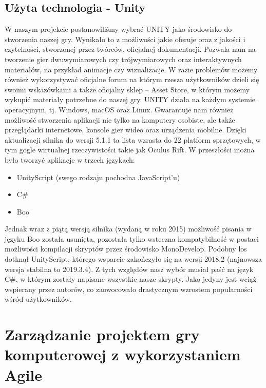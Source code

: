 \documentclass[oneside,polski,logo]{amuthesis}
\begin{document}
\section{Użyta technologia - Unity}
 W naszym projekcie postanowiliśmy wybrać UNITY jako środowisko do stworzenia naszej gry. Wynikało to z możliwości jakie oferuje oraz z jakości i czytelności, stworzonej przez twórców, oficjalnej dokumentacji. Pozwala nam na tworzenie gier dwuwymiarowych czy trójwymiarowych oraz interaktywnych materiałów, na przykład animacje czy wizualizacje. W razie problemów możemy również wykorzystywać oficjalne forum na którym rzesza użytkowników dzieli się swoimi wskazówkami a także oficjalny sklep – Asset Store, w którym możemy wykupić materiały potrzebne do naszej gry. UNITY działa na każdym systemie operacyjnym, tj. Windows, macOS oraz Linux. Gwarantuje nam również możliwość stworzenia aplikacji nie tylko na komputery osobiste, ale także przeglądarki internetowe, konsole gier wideo oraz urządzenia mobilne. Dzięki aktualizacji silnika do wersji 5.1.1 ta lista wzrasta do 22 platform sprzętowych, w tym gogle wirtualnej rzeczywistości takie jak Oculus Rift.
W przeszłości można było tworzyć aplikacje w trzech językach:
\begin{itemize}
	\item UnityScript (swego rodzaju pochodna JavaScript’u)
	\item C\#
	\item Boo
\end{itemize}
Jednak wraz z piątą wersją silnika (wydaną w roku 2015) możliwość pisania w języku Boo została usunięta, pozostała tylko wsteczna kompatybilność w postaci możliwości kompilacji skryptów przez środowisko MonoDevelop. Podobny los dotknął UnityScript, którego wsparcie zakończyło się na wersji 2018.2 (najnowsza wersja stabilna to 2019.3.4). Z tych względów nasz wybór musiał paść na język C\#, w którym zostały napisane wszystkie nasze skrypty. Jako jedyny jest wciąż wspierany przez autorów, co zaowocowało drastycznym wzrostem popularności wśród użytkowników.

\chapter{Zarządzanie projektem gry komputerowej z wykorzystaniem Agile}
\end{document}
